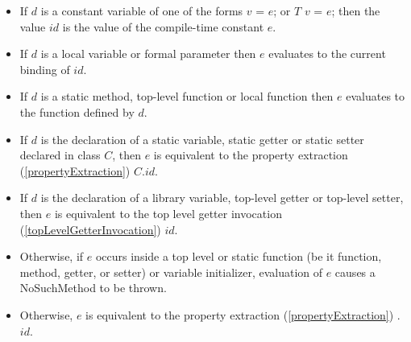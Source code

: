 \documentclass{article}
\newcommand{\code}[1]{{\sf #1}}
\begin{document}
\begin{itemize}
\begin{itemize}
 \item  If $d$ is a constant variable of one of the forms  \code{\CONST{} $v$ = $e$;} or \code{\CONST{} $T$ $v$ = $e$;} then the value $id$ is the value of the compile-time constant $e$.
\item If $d$ is a local variable or formal parameter then $e$ evaluates to the current binding of $id$.
\item If $d$ is a static method, top-level function or local function then $e$ evaluates to the function defined by $d$.
\item If $d$ is the declaration of a static variable, static getter or static setter declared in class $C$, then $e$ is equivalent to the property extraction (\ref{propertyExtraction}) $C.id$.
\item If $d$ is the declaration of a library variable, top-level getter or top-level setter, then $e$ is equivalent to the top level getter invocation (\ref{topLevelGetterInvocation}) $id$.
\item Otherwise, if $e$ occurs inside a top level or static function (be it function, method, getter,  or setter) or variable initializer, evaluation of $e$ causes a \code{NoSuchMethod} to be thrown.
\item Otherwise, $e$ is equivalent to the property extraction (\ref{propertyExtraction}) \THIS{}.$id$.
\end{itemize}


\end{itemize}
\end{document}
